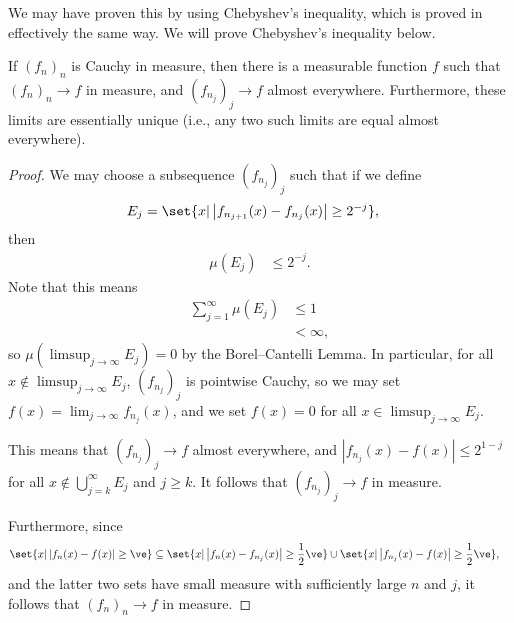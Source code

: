 \documentclass[10pt]{mypackage}
\begin{document}
\begin{remark}
  We may have proven this by using Chebyshev's inequality, which is proved in effectively the same way. We will prove Chebyshev's inequality below.
\end{remark}
\begin{theorem}
  If $\left( f_n \right)_n$ is Cauchy in measure, then there is a measurable function $f$ such that $\left( f_n \right)_n\rightarrow f$ in measure, and $\left( f_{n_{j}} \right)_j\rightarrow f$ almost everywhere. Furthermore, these limits are essentially unique (i.e., any two such limits are equal almost everywhere).
\end{theorem}
\begin{proof}
  We may choose a subsequence $\left( f_{n_{j}} \right)_j$ such that if we define
  \begin{align*}
    E_j &= \set{x | \left\vert f_{n_{j+1}}(x) -f_{n_{j}}(x) \right\vert\geq 2^{-j}},
  \end{align*}
  then
  \begin{align*}
    \mu\left( E_j \right) &\leq 2^{-j}.
  \end{align*}
  Note that this means
  \begin{align*}
    \sum_{j=1}^{\infty}\mu\left( E_j \right) &\leq 1\\
                                             &< \infty,
  \end{align*}
  so $\mu\left( \limsup_{j\rightarrow\infty}E_j \right) = 0$ by the Borel--Cantelli Lemma. In particular, for all $x\notin \limsup_{j\rightarrow\infty} E_j$, $\left( f_{n_{j}} \right)_{j}$ is pointwise Cauchy, so we may set $f(x) = \lim_{j\rightarrow\infty}f_{n_{j}}(x)$, and we set $f(x) = 0$ for all $x\in \limsup_{j\rightarrow\infty}E_j$.\newline

  This means that $\left( f_{n_{j}} \right)_j\rightarrow f$ almost everywhere, and $\left\vert f_{n_{j}}(x) - f(x) \right\vert\leq 2^{1-j}$ for all $x\notin \bigcup_{j=k}^{\infty}E_j$ and $j\geq k$. It follows that $\left( f_{n_{j}} \right)_j\rightarrow f$ in measure.\newline

  Furthermore, since
  \begin{align*}
    \set{x | \left\vert f_n(x)-f(x) \right\vert\geq \ve} &\subseteq \set{x | \left\vert f_{n}(x) -f_{n_{j}}(x) \right\vert \geq \frac{1}{2}\ve} \cup \set{x | \left\vert f_{n_{j}}(x)-f(x) \right\vert \geq \frac{1}{2}\ve},
  \end{align*}
  and the latter two sets have small measure with sufficiently large $n$ and $j$, it follows that $\left( f_{n} \right)_n\rightarrow f$ in measure.
\end{proof}
\end{document}
